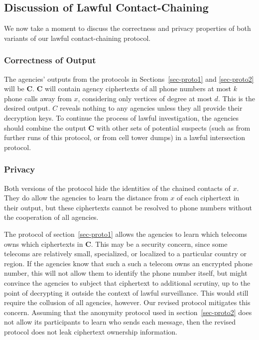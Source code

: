 \subsection{Discussion of Lawful Contact-Chaining}

\label{sec:discuss}



We now take a moment to discuss the correctness and privacy properties of both variants of our lawful contact-chaining protocol.



\subsubsection{Correctness of Output}



The agencies' outputs from the protocols in Sections~\ref{sec-proto1} and \ref{sec-proto2} will be $\mathbf{C}$. $\mathbf{C}$ will contain agency ciphertexts of all phone numbers at most $k$ phone calls away from $x$, considering only vertices of degree at most $d$. This is the desired output. $C$ reveals nothing to any agencies unless they all provide their decryption keys. To continue the process of lawful investigation, the agencies should combine the output $\mathbf{C}$ with other sets of potential suspects (such as from further runs of this protocol, or from cell tower dumps) in a lawful intersection protocol.



\subsubsection{Privacy}



Both versions of the protocol hide the identities of the chained contacts of $x$. They do allow the agencies to learn the distance from $x$ of each ciphertext in their output, but these ciphertexts cannot be resolved to phone numbers without the cooperation of all agencies.



The protocol of section~\ref{sec-proto1} allows the agencies to learn which telecoms owns which ciphertexts in $\mathbf{C}$. This may be a security concern, since some telecoms are relatively small, specialized, or localized to a particular country or region. If the agencies know that such a such a telecom owns an encrypted phone number, this will not allow them to identify the phone number itself, but might convince the agencies to subject that ciphertext to additional scrutiny, up to the point of decrypting it outside the context of lawful surveillance. This would still require the collusion of all agencies, however. Our revised protocol mitigates this concern. Assuming that the anonymity protocol used in section~\ref{sec-proto2} does not allow its participants to learn who sends each message, then the revised protocol does not leak ciphertext ownership information.



